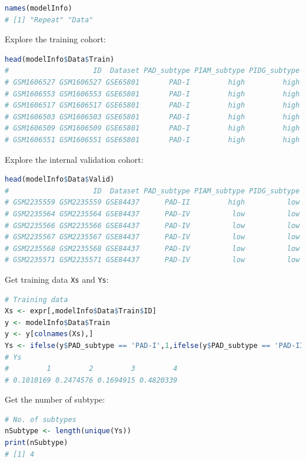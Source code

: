 \documentclass[
  12pt,
]{book}
\newcommand{\passthrough}[1]{#1}
\begin{document}
\begin{lstlisting}[language=R]
names(modelInfo)
# [1] "Repeat" "Data"
\end{lstlisting}

Explore the training cohort:

\begin{lstlisting}[language=R]
head(modelInfo$Data$Train)
#                    ID  Dataset PAD_subtype PIAM_subtype PIDG_subtype platform
# GSM1606527 GSM1606527 GSE65801       PAD-I         high         high GPL14550
# GSM1606553 GSM1606553 GSE65801       PAD-I         high         high GPL14550
# GSM1606517 GSM1606517 GSE65801       PAD-I         high         high GPL14550
# GSM1606503 GSM1606503 GSE65801       PAD-I         high         high GPL14550
# GSM1606509 GSM1606509 GSE65801       PAD-I         high         high GPL14550
# GSM1606551 GSM1606551 GSE65801       PAD-I         high         high GPL14550
\end{lstlisting}

Explore the internal validation cohort:

\begin{lstlisting}[language=R]
head(modelInfo$Data$Valid)
#                    ID  Dataset PAD_subtype PIAM_subtype PIDG_subtype platform
# GSM2235559 GSM2235559 GSE84437      PAD-II         high          low  GPL6947
# GSM2235564 GSM2235564 GSE84437      PAD-IV          low          low  GPL6947
# GSM2235566 GSM2235566 GSE84437      PAD-IV          low          low  GPL6947
# GSM2235567 GSM2235567 GSE84437      PAD-IV          low          low  GPL6947
# GSM2235568 GSM2235568 GSE84437      PAD-IV          low          low  GPL6947
# GSM2235571 GSM2235571 GSE84437      PAD-IV          low          low  GPL6947
\end{lstlisting}

Get training data \passthrough{\lstinline!Xs!} and \passthrough{\lstinline!Ys!}:

\begin{lstlisting}[language=R]
# Training data
Xs <- expr[,modelInfo$Data$Train$ID]
y <- modelInfo$Data$Train
y <- y[colnames(Xs),]
Ys <- ifelse(y$PAD_subtype == 'PAD-I',1,ifelse(y$PAD_subtype == 'PAD-II',2,ifelse(y$PAD_subtype == 'PAD-III',3,ifelse(y$PAD_subtype == 'PAD-IV',4,NA)))); table(Ys)/length(Ys)
# Ys
#         1         2         3         4 
# 0.1010169 0.2474576 0.1694915 0.4820339
\end{lstlisting}

Get the number of subtype:

\begin{lstlisting}[language=R]
# No. of subtypes
nSubtype <- length(unique(Ys))
print(nSubtype)
# [1] 4
\end{lstlisting}
\end{document}
